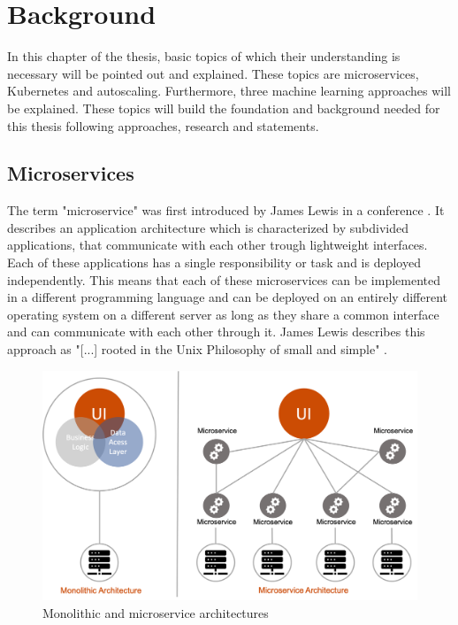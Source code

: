 \documentclass[
	english,
	ruledheaders=section,%
	class=report,%
	thesis={type=master},%
	accentcolor=8c,%
	custommargins=true,%
	marginpar=false,%
	parskip=half-,%
	fontsize=11pt,%
]{tudapub}
\begin{document}
\chapter{Background}
In this chapter of the thesis, basic topics of which their understanding is necessary will be pointed out and explained. These topics are microservices, Kubernetes and autoscaling. Furthermore, three machine learning approaches will be explained. These topics will build the foundation and background needed for this thesis following approaches, research and statements.
\section{Microservices}
The term "microservice" was first introduced by James Lewis in a conference \cite{lewis2012microservices}. It describes an application architecture which is characterized by subdivided applications, that communicate with each other trough lightweight interfaces.\\ 
Each of these applications has a single responsibility or task and is deployed independently. This means that each of these microservices can be implemented in a different programming language and can be deployed on an entirely different operating system on a different server as long as they share a common interface and can communicate with each other through it. James Lewis describes this approach as "[...] rooted in the Unix Philosophy of small and simple" \cite{lewis2012microservices}.\\

\begin{figure}[h]
    \centering
    \includegraphics[width=\textwidth]{data/basics/microservice.png}
    \caption{Monolithic and microservice architectures}
    \label{fig:microservice}
\end{figure}
\end{document}
